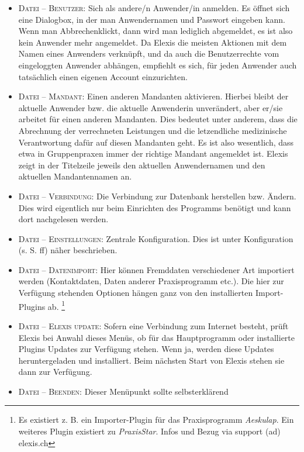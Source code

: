 \begin{itemize}
  \item {\textsc{Datei -- Benutzer}: Sich als andere/n Anwender/in anmelden. Es
  öffnet sich eine Dialogbox, in der man Anwendernamen und Passwort eingeben
  kann. Wenn man \glqq Abbrechen\grqq{}klickt, dann wird man lediglich
  abgemeldet, es ist also kein Anwender mehr angemeldet. Da Elexis die meisten
  Aktionen mit dem Namen eines Anwenders verknüpft, und da auch die
  Benutzerrechte vom eingeloggten Anwender abhängen, empfiehlt es sich, für
  jeden Anwender auch tatsächlich einen eigenen Account einzurichten. }
  \item {\textsc{Datei -- Mandant}: Einen anderen Mandanten aktivieren. Hierbei
  bleibt der aktuelle Anwender bzw. die aktuelle Anwenderin unverändert, aber
  er/sie arbeitet für einen anderen Mandanten. Dies bedeutet unter anderem, dass
  die Abrechnung der verrechneten Leistungen und die letzendliche medizinische
  Verantwortung dafür auf diesen Mandanten geht. Es ist also wesentlich, dass
  etwa in Gruppenpraxen immer der richtige Mandant angemeldet ist. Elexis zeigt
  in der Titelzeile jeweils den aktuellen Anwendernamen und den aktuellen
  Mandantennamen an.}
  \item {\textsc{Datei -- Verbindung}: Die Verbindung zur Datenbank herstellen
  bzw. Ändern. Dies wird eigentlich nur beim Einrichten des Programms benötigt
  und kann dort nachgelesen werden.}
  \item {\textsc{Datei -- Einstellungen}: Zentrale Konfiguration. Dies ist
  unter Konfiguration (s. S. \pageref{settings} ff) näher beschrieben.}
  \item {\textsc{Datei -- Datenimport}: Hier können Fremd\-daten verschie\-de\-ner
  Art impor\-tiert werden (Kontakt\-daten, Da\-ten anderer Praxis\-programm etc.). Die
  hier zur Ver\-fü\-gung ste\-hen\-den Op\-tio\-nen hängen ganz von den instal\-lier\-ten
  Import-Plugins ab.} \footnote{Es existiert z. B. ein Importer-Plugin für das Praxisprogramm \textit{Aeskulap}. Ein weiteres Plugin existiert zu \textit{PraxisStar}. Infos und Bezug via support (ad) elexis.ch}
  \item {\textsc{Datei -- Elexis update}: Sofern eine Verbindung zum Internet
  besteht, prüft Elexis bei Anwahl dieses Menüs, ob für das Hauptprogramm oder
  installierte Plugins Updates zur Verfügung stehen. Wenn ja, werden diese
  Updates heruntergeladen und installiert. Beim nächsten Start von Elexis stehen
  sie dann zur Verfügung.}
  \item {\textsc{Datei -- Beenden}: Dieser Menüpunkt sollte selbsterklärend
}
\end{itemize}
